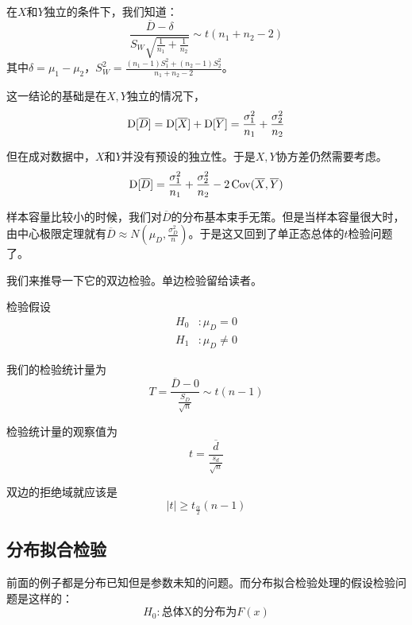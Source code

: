 在$X$和$Y$独立的条件下，我们知道：
\[
\frac{\overline{D}-\delta}{S_W\sqrt{\frac{1}{n_1}+\frac{1}{n_2}}} \sim t(n_1+n_2-2)
\]
其中$\delta=\mu_1-\mu_2$，$S_W^2=\frac{(n_1-1)S_1^2+(n_2-1)S_2^2}{n_1+n_2-2}$。

这一结论的基础是在$X,Y$独立的情况下，
\[
\operatorname{D}[\overline{D}] =\operatorname{D}[\overline{X}]+\operatorname{D}[\overline{Y}]= \frac{\sigma_1^2}{n_1}+\frac{\sigma_2^2}{n_2}
\]

但在成对数据中，$X$和$Y$并没有预设的独立性。于是$X,Y$协方差仍然需要考虑。
\[
\operatorname{D}[\overline{D}]=\frac{\sigma_1^2}{n_1}+\frac{\sigma_2^2}{n_2}-2\operatorname{Cov}(\overline{X},\overline{Y})
\]

样本容量比较小的时候，我们对$\overline{D}$的分布基本束手无策。但是当样本容量很大时，由中心极限定理就有$\overline{D} \approx N(\mu_D,\frac{\sigma_D^2}{n})$。于是这又回到了单正态总体的$t$检验问题了。

我们来推导一下它的双边检验。单边检验留给读者。

检验假设
\begin{align*}
H_0 &: \mu_D = 0\\
H_1 &: \mu_D \neq 0
\end{align*}

我们的检验统计量为
\[
T=\frac{\overline{D}-0}{\frac{S_D}{\sqrt{n}}} \sim t(n-1)
\]

检验统计量的观察值为
\[
t=\frac{\overline{d}}{\frac{s_d}{\sqrt{n}}}
\]

双边的拒绝域就应该是
\[
|t| \geq t_{\frac{\alpha}{2}}(n-1)
\]

\subsection{分布拟合检验}
前面的例子都是分布已知但是参数未知的问题。而分布拟合检验处理的假设检验问题是这样的：
\[
H_0:\text{总体X的分布为}F(x)
\]

